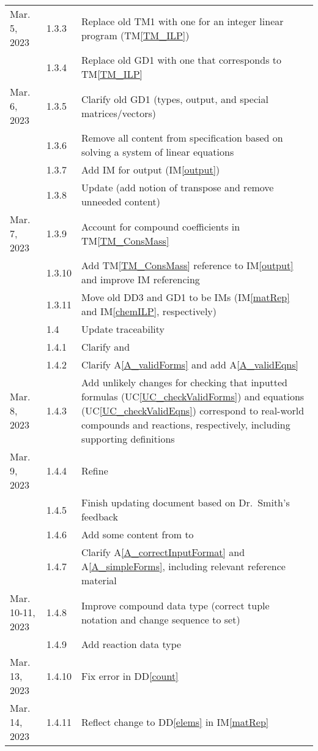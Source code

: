 \documentclass[12pt]{article}
\newcommand{\ddref}[1]{DD\ref{#1}}
\newcommand{\tmref}[1]{TM\ref{#1}}
\newcommand{\aref}[1]{A\ref{#1}}
\newcommand{\imref}[1]{IM\ref{#1}}
\newcommand{\ucref}[1]{UC\ref{#1}}
\begin{document}
\begin{xltabular}{\textwidth}{llX}
  Mar. 5, 2023 & 1.3.3 & Replace old TM1 with one for an integer linear program
  (\tmref{TM_ILP})\\
  & 1.3.4 & Replace old GD1 with one that corresponds to \tmref{TM_ILP} \\
  Mar. 6, 2023 & 1.3.5 & Clarify old GD1 (types, output, and special
  matrices/vectors) \\
  & 1.3.6 & Remove all content from specification based on solving a system of
  linear equations \\
  & 1.3.7 & Add IM for output (\imref{output}) \\
  & 1.3.8 & Update  (add notion of transpose and remove
  unneeded content) \\
  Mar. 7, 2023 & 1.3.9 & Account for compound coefficients in
  \tmref{TM_ConsMass} \\
  & 1.3.10 & Add \tmref{TM_ConsMass} reference to \imref{output} and improve IM
  referencing \\
  & 1.3.11 & Move old DD3 and GD1 to be IMs (\imref{matRep} and
  \imref{chemILP}, respectively) \\
  & 1.4 & Update traceability \\
  & 1.4.1 & Clarify  and  \\
  & 1.4.2 & Clarify \aref{A_validForms} and add \aref{A_validEqns} \\
  Mar. 8, 2023 & 1.4.3 & Add unlikely changes for checking that inputted
  formulas (\ucref{UC_checkValidForms}) and equations
  (\ucref{UC_checkValidEqns}) correspond to real-world compounds and reactions,
  respectively, including supporting definitions \\
  Mar. 9, 2023 & 1.4.4 & Refine  \\
  & 1.4.5 & Finish updating document based on Dr.~Smith's feedback \\
  & 1.4.6 & Add some content from  to
   \\
  & 1.4.7 & Clarify \aref{A_correctInputFormat} and \aref{A_simpleForms},
  including relevant reference material \\
  Mar. 10-11, 2023 & 1.4.8 & Improve compound data type (correct tuple notation
  and change sequence to set) \\
  & 1.4.9 & Add reaction data type \\
  Mar. 13, 2023 & 1.4.10 & Fix error in \ddref{count} \\
  Mar. 14, 2023 & 1.4.11 & Reflect change to \ddref{elems} in \imref{matRep} \\
\end{xltabular}
\end{document}
